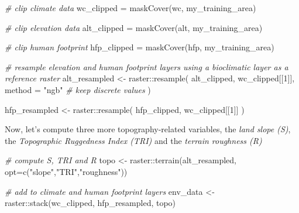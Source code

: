 \documentclass[
]{article}
\newenvironment{Shaded}{\begin{snugshade}}{\end{snugshade}}
\newcommand{\AttributeTok}[1]{\textcolor[rgb]{0.77,0.63,0.00}{#1}}
\newcommand{\CommentTok}[1]{\textcolor[rgb]{0.56,0.35,0.01}{\textit{#1}}}
\newcommand{\DecValTok}[1]{\textcolor[rgb]{0.00,0.00,0.81}{#1}}
\newcommand{\FunctionTok}[1]{\textcolor[rgb]{0.00,0.00,0.00}{#1}}
\newcommand{\NormalTok}[1]{#1}
\newcommand{\OtherTok}[1]{\textcolor[rgb]{0.56,0.35,0.01}{#1}}
\newcommand{\SpecialCharTok}[1]{\textcolor[rgb]{0.00,0.00,0.00}{#1}}
\newcommand{\StringTok}[1]{\textcolor[rgb]{0.31,0.60,0.02}{#1}}
\begin{document}
\begin{Shaded}
\begin{Highlighting}[]

\CommentTok{\# clip climate data}
\NormalTok{wc\_clipped }\OtherTok{=} \FunctionTok{maskCover}\NormalTok{(wc, my\_training\_area)}

\CommentTok{\# clip elevation data}
\NormalTok{alt\_clipped }\OtherTok{=} \FunctionTok{maskCover}\NormalTok{(alt, my\_training\_area)}

\CommentTok{\# clip human footprint}
\NormalTok{hfp\_clipped }\OtherTok{=} \FunctionTok{maskCover}\NormalTok{(hfp, my\_training\_area)}

\CommentTok{\# resample elevation and human footprint layers using a bioclimatic layer as a reference raster}
\NormalTok{alt\_resampled }\OtherTok{\textless{}{-}}\NormalTok{ raster}\SpecialCharTok{::}\FunctionTok{resample}\NormalTok{(}
\NormalTok{  alt\_clipped,}
\NormalTok{  wc\_clipped[[}\DecValTok{1}\NormalTok{]],}
  \AttributeTok{method =} \StringTok{"ngb"}  \CommentTok{\# keep discrete values}
\NormalTok{)}

\NormalTok{hfp\_resampled }\OtherTok{\textless{}{-}}\NormalTok{ raster}\SpecialCharTok{::}\FunctionTok{resample}\NormalTok{(}
\NormalTok{  hfp\_clipped,}
\NormalTok{  wc\_clipped[[}\DecValTok{1}\NormalTok{]]}
\NormalTok{)}
\end{Highlighting}
\end{Shaded}

Now, let's compute three more topography-related variables, the
\emph{land slope (S)}, the \emph{Topographic Ruggedness Index (TRI)} and
the \emph{terrain roughness (R)}

\begin{Shaded}
\begin{Highlighting}[]

\CommentTok{\# compute S, TRI and R}
\NormalTok{topo }\OtherTok{\textless{}{-}}\NormalTok{ raster}\SpecialCharTok{::}\FunctionTok{terrain}\NormalTok{(alt\_resampled, }\AttributeTok{opt=}\FunctionTok{c}\NormalTok{(}\StringTok{"slope"}\NormalTok{,}\StringTok{"TRI"}\NormalTok{,}\StringTok{"roughness"}\NormalTok{))}

\CommentTok{\# add to climate and human footprint layers}
\NormalTok{env\_data }\OtherTok{\textless{}{-}}\NormalTok{ raster}\SpecialCharTok{::}\FunctionTok{stack}\NormalTok{(wc\_clipped, hfp\_resampled, topo)}
\end{Highlighting}
\end{Shaded}
\end{document}
